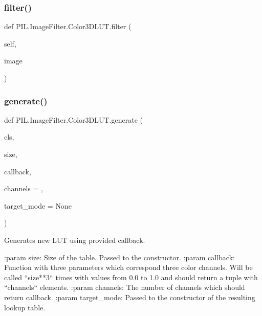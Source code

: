 \subsubsection{\texorpdfstring{filter()}{filter()}}
{\footnotesize\ttfamily def P\+I\+L.\+Image\+Filter.\+Color3\+D\+L\+U\+T.\+filter (\begin{DoxyParamCaption}\item[{}]{self,  }\item[{}]{image }\end{DoxyParamCaption})}

\mbox{\label{classPIL_1_1ImageFilter_1_1Color3DLUT_af80f64b84c0157d641cbf5b60bbc0606}} 
\subsubsection{\texorpdfstring{generate()}{generate()}}
{\footnotesize\ttfamily def P\+I\+L.\+Image\+Filter.\+Color3\+D\+L\+U\+T.\+generate (\begin{DoxyParamCaption}\item[{}]{cls,  }\item[{}]{size,  }\item[{}]{callback,  }\item[{}]{channels = {},  }\item[{}]{target\+\_\+mode = {\ttfamily None} }\end{DoxyParamCaption})}

\begin{DoxyVerb}Generates new LUT using provided callback.

:param size: Size of the table. Passed to the constructor.
:param callback: Function with three parameters which correspond
         three color channels. Will be called ``size**3``
         times with values from 0.0 to 1.0 and should return
         a tuple with ``channels`` elements.
:param channels: The number of channels which should return callback.
:param target_mode: Passed to the constructor of the resulting
            lookup table.
\end{DoxyVerb}
 \mbox{\label{classPIL_1_1ImageFilter_1_1Color3DLUT_aa42987bda5ef095a42c5bea459143470}} 
